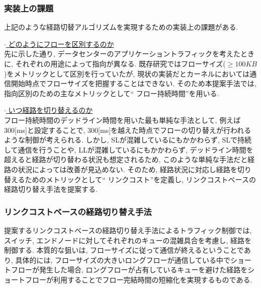 \subsubsection{実装上の課題}
上記のような経路切替アルゴリズムを実現するための実装上の課題がある. 

\underline{$\cdot$ どのようにフローを区別するのか} \\
先に示した通り, データセンターのアプリケーショントラフィックを考えたときに, それぞれの用途によって指向が異なる. 
既存研究ではフローサイズ($\geq 100KB$)をメトリックとして区別\cite{repflow}を行っていたが,
現状の実装だとカーネルにおいては通信開始時点でフローサイズを把握することはできない. 
そのため本提案手法では, 指向区別のための主なメトリックとして`` フロー持続時間''を用いる.

\underline{$\cdot$ いつ経路を切り替えるのか} \\
フロー持続時間のデッドライン時間を用いた最も単純な手法として, 例えば300[ms]と設定することで,
300[ms]を越えた時点でフローの切り替えが行われるような制御が考えられる. 
しかし, SLが混雑しているにもかかわらず, SLで持続して通信を行うことや, LLが混雑しているにもかかわらず,
デッドライン時間を超えると経路が切り替わる状況も想定されるため, このような単純な手法だと経路の状況によっては改善が見込めない. 
そのため, 経路状況に対応し経路を切り替えるためのメトリックとして`` リンクコスト''を定義し, リンクコストベースの経路切り替え手法を提案する. 

\subsubsection{リンクコストベースの経路切り替え手法}

提案するリンクコストベースの経路切り替え手法によるトラフィック制御では, スイッチ, エンドノードに対してそれぞれのキューの混雑具合を考慮し,
経路を制御する.
本質的な狙いは, フローサイズに従って通信が終えるということであり, 具体的には,
フローサイズの大きいロングフローが通信している中でショートフローが発生した場合,
ロングフローが占有しているキューを避けた経路をショートフローが利用することでフロー完結時間の短縮化を実現するものである.


